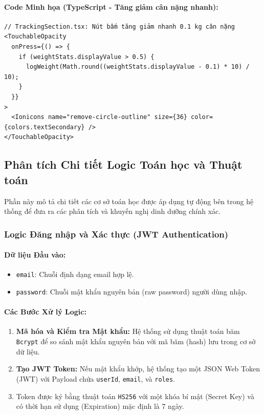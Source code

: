 \documentclass[12pt,a4paper]{article}
\begin{document}
\paragraph{Code Minh họa (TypeScript - Tăng giảm cân nặng nhanh):}
\begin{verbatim}
// TrackingSection.tsx: Nút bấm tăng giảm nhanh 0.1 kg cân nặng
<TouchableOpacity
  onPress={() => {
    if (weightStats.displayValue > 0.5) {
      logWeight(Math.round((weightStats.displayValue - 0.1) * 10) / 10);
    }
  }}
>
  <Ionicons name="remove-circle-outline" size={36} color={colors.textSecondary} />
</TouchableOpacity>
\end{verbatim}

\subsection{Phân tích Chi tiết Logic Toán học và Thuật toán}

Phần này mô tả chi tiết các cơ sở toán học được áp dụng tự động bên trong hệ thống để đưa ra các phân tích và khuyến nghị dinh dưỡng chính xác.

\subsubsection{Logic Đăng nhập và Xác thực (JWT Authentication)}

\paragraph{Dữ liệu Đầu vào:} 
\begin{itemize}
    \item \texttt{email}: Chuỗi định dạng email hợp lệ.
    \item \texttt{password}: Chuỗi mật khẩu nguyên bản (raw password) người dùng nhập.
\end{itemize}

\paragraph{Các Bước Xử lý Logic:}
\begin{enumerate}
    \item \textbf{Mã hóa và Kiểm tra Mật khẩu:} Hệ thống sử dụng thuật toán băm \texttt{Bcrypt} để so sánh mật khẩu nguyên bản với mã băm (hash) lưu trong cơ sở dữ liệu.
    \item \textbf{Tạo JWT Token:} Nếu mật khẩu khớp, hệ thống tạo một JSON Web Token (JWT) với Payload chứa \texttt{userId}, \texttt{email}, và \texttt{roles}.
    \item Token được ký bằng thuật toán \texttt{HS256} với một khóa bí mật (Secret Key) và có thời hạn sử dụng (Expiration) mặc định là 7 ngày.
\end{enumerate}
\end{document}
